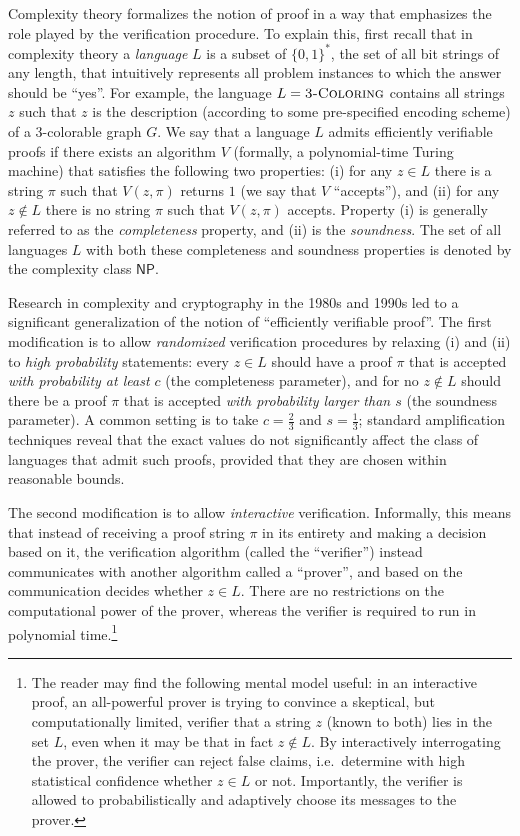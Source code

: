 \documentclass[11pt]{article}
\theoremstyle{definition}
\newcommand{\class}[1]{\ensuremath{\mathsf{#1}}\xspace}
\newcommand{\NP}{\class{NP}} \newcommand{\IP}{\class{IP}} \newcommand{\EXP}{\class{EXP}} \newcommand{\NEXP}{\class{NEXP}} \newcommand{\QMA}{\class{QMA}} \newcommand{\QMIP}{\class{QMIP}} \WithSuffix\newcommand\QMIP*{\ensuremath{\class{QMIP}^*}} \newcommand{\PSPACE}{\class{PSPACE}} \newcommand{\PCP}{\class{PCP}} \newcommand{\MIP}{\class{MIP}} \newcommand{\MIPco}{\class{MIP}^{\mathrm{co}}} \newcommand{\RE}{\class{RE}} \newcommand{\coRE}{\class{coRE}}
\begin{document}
Complexity theory formalizes the notion of proof in a way that emphasizes the role played by the verification procedure. To explain this, first recall that in complexity theory a \emph{language} $L$ is a subset of $\{0,1\}^*$, the set of all bit strings of any length, that intuitively represents all problem instances to which the answer should be ``yes''. For example, the language $L=\textsc{3-Coloring}$ contains all strings $z$ such that $z$ is the description (according to some pre-specified encoding scheme) of a $3$-colorable graph $G$. We say that a language $L$ admits efficiently verifiable proofs if there exists an algorithm $V$ (formally, a polynomial-time Turing machine) that satisfies the following two properties: (i) for any $z\in L$ there is a string $\pi$ such that $V(z,\pi)$ returns $1$ (we say that $V$ ``accepts''), and (ii) for any $z\notin L$ there is no string $\pi$ such that $V(z,\pi)$ accepts. Property (i) is generally referred to as the \emph{completeness} property, and (ii) is the \emph{soundness}. The set of all languages $L$ with both these completeness and soundness properties is denoted by the complexity class $\NP$.


Research in complexity and cryptography in the 1980s and 1990s led to a significant generalization of the notion of ``efficiently verifiable proof''. The first modification is to allow \emph{randomized} verification procedures by relaxing (i) and (ii) to \emph{high probability} statements: every $z\in L$ should have a proof $\pi$ that is accepted \emph{with probability at least $c$} (the completeness parameter), and for no $z\notin L$ should there be a proof $\pi$ that is accepted \emph{with probability larger than $s$} (the soundness parameter).
A common setting is to take $c=\frac{2}{3}$ and $s=\frac{1}{3}$; standard amplification techniques reveal that the exact values do not significantly affect the class of languages that admit such proofs, provided that they are chosen within reasonable bounds. 

The second modification is to allow \emph{interactive} verification. 
Informally, this means that instead of receiving a proof string $\pi$ in its entirety and making a decision based on it, the verification algorithm (called the ``verifier'') instead communicates with another algorithm called a ``prover'', and based on the communication decides whether $z\in L$. There are no restrictions on the computational power of the prover, whereas the verifier is required to run in polynomial time.\footnote{The reader may find the following mental model useful: in an interactive proof, an all-powerful prover is trying to convince a skeptical, but computationally limited, verifier that a string $z$ (known to both) lies in the set $L$, even when it may be that in fact $z \notin L$. By interactively interrogating the prover, the verifier can reject false claims, i.e.\ determine with high statistical confidence whether $z \in L$ or not. Importantly, the verifier is allowed to probabilistically and adaptively choose its messages to the prover. }
\end{document}
